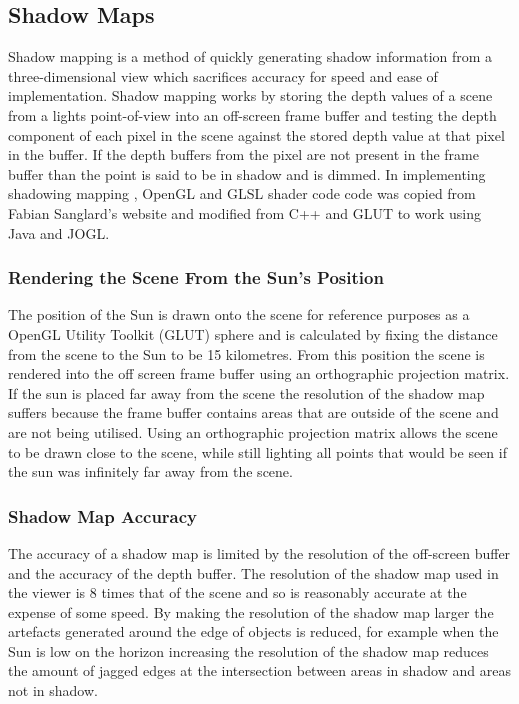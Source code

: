 \documentclass[12pt]{report}
\begin{document}
\subsection{Shadow Maps}
Shadow mapping is a method of quickly generating shadow information from a three-dimensional view which sacrifices accuracy for speed and ease of implementation. Shadow mapping works by storing the depth values of a scene from a lights point-of-view into an off-screen frame buffer and testing the depth component of each pixel in the scene against the stored depth value at that pixel in the buffer. If the depth buffers from the pixel are not present in the frame buffer than the point is said to be in shadow and is dimmed. In implementing shadowing mapping , OpenGL and GLSL shader code code was copied from Fabian Sanglard's website\cite{shadowb} and modified from C++ and GLUT to work using Java and JOGL.

\subsubsection{Rendering the Scene From the Sun's Position}
The position of the Sun is drawn onto the scene for reference purposes as a OpenGL Utility Toolkit (GLUT) sphere and is calculated by fixing the distance from the scene to the Sun to be 15 kilometres. From this position the scene is rendered into the off screen frame buffer using an orthographic projection matrix. If the sun is placed far away from the scene the resolution of the shadow map suffers because the frame buffer contains areas that are outside of the scene and are not being utilised. Using an orthographic projection matrix allows the scene to be drawn close to the scene, while still lighting all points that would be seen if the sun was infinitely far away from the scene.

\subsubsection{Shadow Map Accuracy}
The accuracy of a shadow map is limited by the resolution of the off-screen buffer and the accuracy of the depth buffer. The resolution of the shadow map used in the viewer is 8 times that of the scene and so is reasonably accurate at the expense of some speed. By making the resolution of the shadow map larger the artefacts generated around the edge of objects is reduced, for example when the Sun is low on the horizon increasing the resolution of the shadow map reduces the amount of jagged edges at the intersection between areas in shadow and areas not in shadow. 
\end{document}
